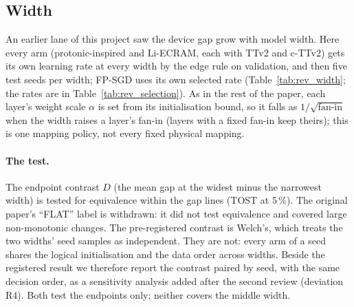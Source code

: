 \subsection{Width}\label{sec:scale}
An earlier lane of this project saw the device gap grow with model width. Here every arm (protonic-inspired and Li-ECRAM, each
with TTv2 and c-TTv2) gets its own learning rate at every width by the edge rule on validation, and then five test seeds per
width; FP-SGD uses its own selected rate (Table~\ref{tab:rev_width}; the rates are in Table~\ref{tab:rev_selection}). As in the
rest of the paper, each layer's weight scale $\alpha$ is set from its initialisation bound, so it falls as $1/\sqrt{\text{fan-in}}$
when the width raises a layer's fan-in (layers with a fixed fan-in keep theirs); this is one mapping policy, not every fixed
physical mapping.

\paragraph{The test.} The endpoint contrast $D$ (the mean gap at the widest minus the narrowest width) is tested for
equivalence within the gap lines (TOST at 5\,\%). The original paper's ``FLAT'' label is withdrawn: it did not test equivalence
and covered large non-monotonic changes. The pre-registered contrast is Welch's, which treats the two widths' seed samples as
independent. They are not: every arm of a seed shares the logical initialisation and the data order across widths. Beside the
registered result we therefore report the contrast paired by seed, with the same decision order, as a sensitivity analysis
added after the second review (deviation R4). Both test the endpoints only; neither covers the middle width.

